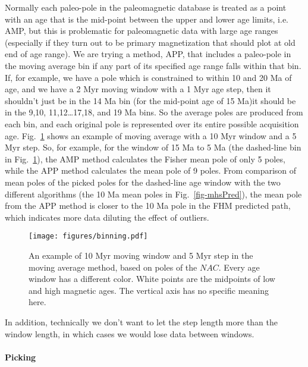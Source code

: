 Normally each paleo-pole in the paleomagnetic database is treated as a point
with an age that is the mid-point between the upper and lower age limits, i.e.
AMP, but this is problematic for paleomagnetic data with large age ranges
(especially if they turn out to be primary magnetization that should plot at old
end of age range). We are trying a method, APP, that includes a paleo-pole in
the moving average bin if any part of its specified age range falls within that
bin. If, for example, we have a pole which is constrained to within 10 and 20 Ma
of age, and we have a 2 Myr moving window with a 1 Myr age step, then it
shouldn't just be in the 14 Ma bin (for the mid-point age of 15
Ma)\textemdash{}it should be in the 9,10,
11,12\ldots17,18, and
19 Ma bins. So the average poles are produced from each bin, and
each original pole is represented over its entire possible acquisition age.
Fig.~\ref{fig-nac-maplat} shows an example of moving average with a 10 Myr
window and a 5 Myr step. So, for example, for the window of 15 Ma to 5 Ma (the
dashed-line bin in Fig.~\ref{fig-nac-maplat}), the AMP method calculates the
Fisher mean pole of only 5 poles, while the APP method calculates the mean pole
of 9 poles. From comparison of mean poles of the picked poles for the
dashed-line age window with the two different algorithms (the 10 Ma mean poles
in Fig.~\ref{fig-mhsPred}), the mean pole from the APP method is closer to the
10 Ma pole in the FHM predicted path, which indicates more data diluting the
effect of outliers.

\begin{figure}
\centering
\texttt{[image: figures/binning.pdf]}
\caption[Moving average (MA) methods]{An example of 10 Myr moving window and 5
Myr step in the moving average method, based on poles of the $NAC$. Every age
window has a different color. White points are the midpoints of low and high
magnetic ages. The vertical axis has no specific meaning here.
}\label{fig-nac-maplat}
\end{figure}

In addition, technically we don't want to let the step length more than the
window length, in which cases we would lose data between windows.

\paragraph{Picking}

